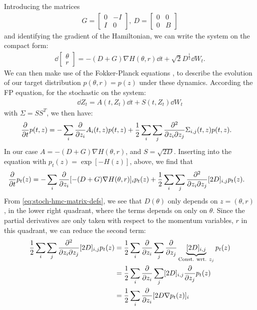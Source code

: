 Introducing the matrices
\begin{align} \label{eq:stoch-hmc-matrix-defs}
    G=\begin{bmatrix}0 & -I \\ I & 0 \end{bmatrix}, ~ 
    D = \begin{bmatrix}
        0 & 0 \\ 
        0 & B
    \end{bmatrix}
\end{align}
and identifying the gradient of the Hamiltonian, we can write the system on the compact form: 
\begin{align}
    \dd{\begin{bmatrix}\theta \\ r\end{bmatrix}}= - (D+G) \nabla H(\theta, r)\dd{t} + \sqrt{2}D^{\frac{1}{2}} \dd{W_t}.
\end{align}
We can then make use of the Fokker-Planck equations \cite{ottinger_stochastic_1996}, to describe the evolution of our target distribution $p(\theta, r)=p(z)$ under these dynamics. 
According the FP equation, for the stochastic on the system:
\begin{align}
    \dd{Z_t} =A(t, Z_t) \dd{t}+ S(t, Z_t)\dd{W_t}
\end{align}
with $\Sigma=SS^T$, we then have:
\begin{align}
    \pdv{t} p(t, z) &= - \sum_{i} \pdv{z_i} A_i(t, z) p(t, z) 
    + \frac{1}{2}\sum_{i}\sum_{j}\pdv{}{z_i}{z_j}\Sigma_{i,j}(t, z)p(t, z). 
\end{align}
In our case $A = -(D+G)\nabla H(\theta, r)$, and $S = \sqrt{2D}$.
Inserting into the equation with $p_t(z) = \exp[-H(z)]$, above, we find that
\begin{align} \label{eq:stoch-hmc-fp}
    \pdv{t} p_t(z) &= - \sum_{i} \pdv{z_i} [ -(D+G)\nabla H(\theta, r)]_i p_t(z) 
    + \frac{1}{2}\sum_{i}\sum_{j}\pdv{}{z_i}{z_j}[2D]_{i,j}p_t(z). 
\end{align}
From \cref{eq:stoch-hmc-matrix-defs}, we see that $D(\theta)$ only depends on $z = (\theta, r)$, in the lower right quadrant, where the terms depends on only on $\theta$.
Since the partial derivatives are only taken with respect to the momentum variables, $r$ in this quadrant, we can reduce the second term:
\begin{align}
    \frac{1}{2}\sum_{i}\sum_{j}\pdv{}{z_i}{z_j}[2D]_{i,j}p_t(z)
    &= \frac{1}{2}\sum_{i}\pdv{z_i}\sum_{j}\pdv{z_j}\underbrace{[2D]_{i,j}}_{\text{Const. wrt. $z_j$}}p_t(z) \\
    &= \frac{1}{2}\sum_{i}\pdv{z_i}\sum_{j}[2D]_{i,j}\pdv{z_j}p_t(z)\\
    &= \frac{1}{2}\sum_{i}\pdv{z_i}[2D \nabla p_t(z)]_{i}
\end{align}
